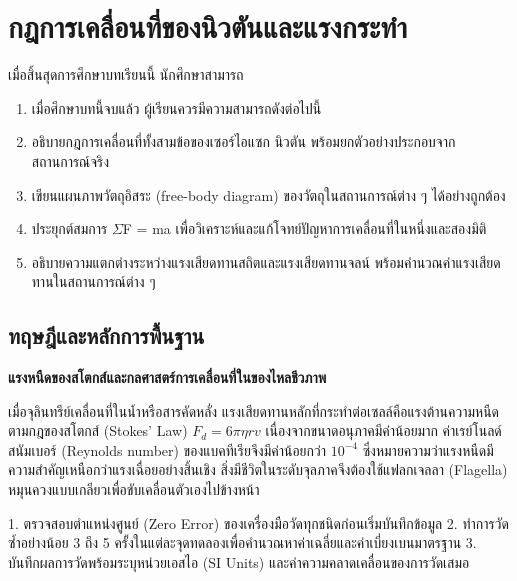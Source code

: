 \chapter{กฎการเคลื่อนที่ของนิวตันและแรงกระทำ}
\label{ch:ch04_newton_laws}

\begin{conceptbox}[title=วัตถุประสงค์การเรียนรู้ประจำบท]
เมื่อสิ้นสุดการศึกษาบทเรียนนี้ นักศึกษาสามารถ
\begin{enumerate}
    \item เมื่อศึกษาบทนี้จบแล้ว ผู้เรียนควรมีความสามารถดังต่อไปนี้
    \item อธิบายกฎการเคลื่อนที่ทั้งสามข้อของเซอร์ไอแซก นิวตัน พร้อมยกตัวอย่างประกอบจากสถานการณ์จริง
    \item เขียนแผนภาพวัตถุอิสระ (free-body diagram) ของวัตถุในสถานการณ์ต่าง ๆ ได้อย่างถูกต้อง
    \item ประยุกต์สมการ $\Sigma$F = ma เพื่อวิเคราะห์และแก้โจทย์ปัญหาการเคลื่อนที่ในหนึ่งและสองมิติ
    \item อธิบายความแตกต่างระหว่างแรงเสียดทานสถิตและแรงเสียดทานจลน์ พร้อมคำนวณค่าแรงเสียดทานในสถานการณ์ต่าง ๆ
\end{enumerate}
\end{conceptbox}

\section{ทฤษฎีและหลักการพื้นฐาน}

\begin{bioappbox}
\textbf{แรงหนืดของสโตกส์และกลศาสตร์การเคลื่อนที่ในของไหลชีวภาพ}

เมื่อจุลินทรีย์เคลื่อนที่ในน้ำหรือสารคัดหลั่ง แรงเสียดทานหลักที่กระทำต่อเซลล์คือแรงต้านความหนืดตามกฎของสโตกส์ (Stokes' Law) $F_d = 6\pi\eta r v$ เนื่องจากขนาดอนุภาคมีค่าน้อยมาก ค่าเรย์โนลด์สนัมเบอร์ (Reynolds number) ของแบคทีเรียจึงมีค่าน้อยกว่า $10^{-4}$ ซึ่งหมายความว่าแรงหนืดมีความสำคัญเหนือกว่าแรงเฉื่อยอย่างสิ้นเชิง สิ่งมีชีวิตในระดับจุลภาคจึงต้องใช้แฟลกเจลลา (Flagella) หมุนควงแบบเกลียวเพื่อขับเคลื่อนตัวเองไปข้างหน้า
\end{bioappbox}

\begin{labbox}
1. ตรวจสอบตำแหน่งศูนย์ (Zero Error) ของเครื่องมือวัดทุกชนิดก่อนเริ่มบันทึกข้อมูล
2. ทำการวัดซ้ำอย่างน้อย 3 ถึง 5 ครั้งในแต่ละจุดทดลองเพื่อคำนวณหาค่าเฉลี่ยและค่าเบี่ยงเบนมาตรฐาน
3. บันทึกผลการวัดพร้อมระบุหน่วยเอสไอ (SI Units) และค่าความคลาดเคลื่อนของการวัดเสมอ
\end{labbox}

